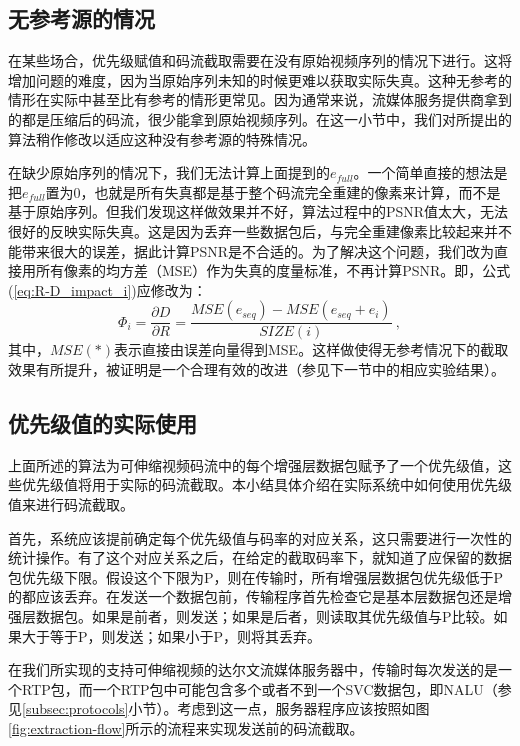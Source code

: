\subsection{无参考源的情况}
\label{subsec:noref}

在某些场合，优先级赋值和码流截取需要在没有原始视频序列的情况下进行。这将增加问题的难度，因为当原始序列未知的时候更难以获取实际失真。这种无参考的情形在实际中甚至比有参考的情形更常见。因为通常来说，流媒体服务提供商拿到的都是压缩后的码流，很少能拿到原始视频序列。在这一小节中，我们对所提出的算法稍作修改以适应这种没有参考源的特殊情况。

在缺少原始序列的情况下，我们无法计算上面提到的$e_{full}$。一个简单直接的想法是把$e_{full}$置为0，也就是所有失真都是基于整个码流完全重建的像素来计算，而不是基于原始序列。但我们发现这样做效果并不好，算法过程中的PSNR值太大，无法很好的反映实际失真。这是因为丢弃一些数据包后，与完全重建像素比较起来并不能带来很大的误差，据此计算PSNR是不合适的。为了解决这个问题，我们改为直接用所有像素的均方差（MSE）作为失真的度量标准，不再计算PSNR。即，公式(\ref{eq:R-D_impact_i})应修改为：
\begin{equation}
\label{eq:R-D_impact_i_noref}
\Phi_i = \dfrac{\partial D}{\partial R} = \dfrac{MSE(e_{seq}) - MSE(e_{seq} + e_i)}{SIZE(i)} \: ,
\end{equation}
其中，$MSE(*)$表示直接由误差向量得到MSE。这样做使得无参考情况下的截取效果有所提升，被证明是一个合理有效的改进（参见下一节中的相应实验结果）。

\subsection{优先级值的实际使用}

上面所述的算法为可伸缩视频码流中的每个增强层数据包赋予了一个优先级值，这些优先级值将用于实际的码流截取。本小结具体介绍在实际系统中如何使用优先级值来进行码流截取。

首先，系统应该提前确定每个优先级值与码率的对应关系，这只需要进行一次性的统计操作。有了这个对应关系之后，在给定的截取码率下，就知道了应保留的数据包优先级下限。假设这个下限为P，则在传输时，所有增强层数据包优先级低于P的都应该丢弃。在发送一个数据包前，传输程序首先检查它是基本层数据包还是增强层数据包。如果是前者，则发送；如果是后者，则读取其优先级值与P比较。如果大于等于P，则发送；如果小于P，则将其丢弃。

在我们所实现的支持可伸缩视频的达尔文流媒体服务器中，传输时每次发送的是一个RTP包，而一个RTP包中可能包含多个或者不到一个SVC数据包，即NALU（参见\ref{subsec:protocols}小节）。考虑到这一点，服务器程序应该按照如图\ref{fig:extraction-flow}所示的流程来实现发送前的码流截取。

